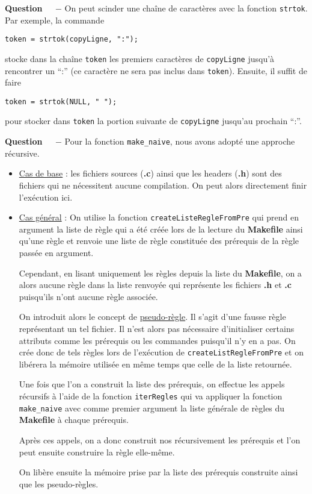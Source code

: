 \documentclass[11pt]{report}
\newcounter{question}[section]
\newenvironment{question}[1][]{\refstepcounter{question}\par\medskip
   \noindent\textbf{Question~\thequestion ~ $-$} \rmfamily}{}
\begin{document}
\begin{question}
On peut scinder une chaîne de caractères avec la fonction \texttt{strtok}. Par exemple, la commande
\begin{center}
\texttt{token = strtok(copyLigne, ":");}
\end{center}
stocke dans la chaîne \texttt{token} les premiers caractères de \texttt{copyLigne} jusqu'à rencontrer un ``:'' (ce caractère ne sera pas inclus dans \texttt{token}). Ensuite, il suffit de faire
\begin{center}
\texttt{token = strtok(NULL, " ");}
\end{center}
pour stocker dans \texttt{token} la portion suivante de \texttt{copyLigne} jusqu'au prochain ``:''.


\end{question}

\begin{question} %
Pour la fonction \texttt{make\_naive}, nous avons adopté une approche récursive.
\begin{itemize}
	\item \underline{Cas de base} : les fichiers sources (\textbf{.c}) ainsi que les headers (\textbf{.h}) sont des fichiers qui ne nécessitent aucune compilation.
	On peut alors directement finir l'exécution ici.
	\item \underline{Cas général} : On utilise la fonction \texttt{createListeRegleFromPre} qui prend en argument la liste de règle qui a été créée lors de la lecture du \textbf{Makefile} ainsi qu'une règle
	et renvoie une liste de règle constituée des prérequis de la règle passée en argument.

	Cependant, en lisant uniquement les règles depuis la liste du \textbf{Makefile}, on a alors aucune règle dans la liste renvoyée qui représente les fichiers \textbf{.h} et \textbf{.c} puisqu'ils n'ont aucune règle associée.

	On introduit alors le concept de \underline{pseudo-règle}. Il s'agit d'une fausse règle représentant un tel fichier. Il n'est alors pas nécessaire d'initialiser certains attributs comme les prérequis ou les commandes puisqu'il n'y en a pas.
	On crée donc de tels règles lors de l'exécution de \texttt{createListRegleFromPre} et on libérera la mémoire utilisée en même temps que celle de la liste retournée.

	Une fois que l'on a construit la liste des prérequis, on effectue les appels récursifs à l'aide de la fonction \texttt{iterRegles} qui va appliquer la fonction \texttt{make\_naive} avec comme premier argument la liste générale de règles du \textbf{Makefile} à chaque prérequis.

	Après ces appels, on a donc construit nos récursivement les prérequis et l'on peut ensuite construire la règle elle-même.
	
	On libère ensuite la mémoire prise par la liste des prérequis construite ainsi que les pseudo-règles.
\end{itemize}
\end{question}
\end{document}
